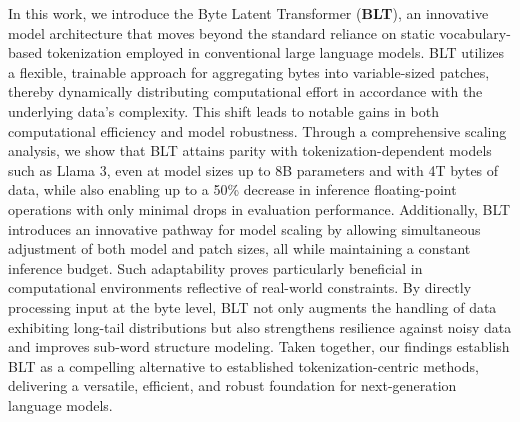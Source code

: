 In this work, we introduce the Byte Latent Transformer (\textbf{BLT}), an innovative model architecture that moves beyond the standard reliance on static vocabulary-based tokenization employed in conventional large language models. \textsc{BLT} utilizes a flexible, trainable approach for aggregating bytes into variable-sized patches, thereby dynamically distributing computational effort in accordance with the underlying data's complexity. This shift leads to notable gains in both computational efficiency and model robustness. Through a comprehensive scaling analysis, we show that {\textsc BLT} attains parity with tokenization-dependent models such as Llama 3, even at model sizes up to 8B parameters and with 4T bytes of data, while also enabling up to a 50\% decrease in inference floating-point operations with only minimal drops in evaluation performance. Additionally, {\textsc BLT} introduces an innovative pathway for model scaling by allowing simultaneous adjustment of both model and patch sizes, all while maintaining a constant inference budget. Such adaptability proves particularly beneficial in computational environments reflective of real-world constraints. By directly processing input at the byte level, {\textsc BLT} not only augments the handling of data exhibiting long-tail distributions but also strengthens resilience against noisy data and improves sub-word structure modeling. Taken together, our findings establish {\textsc BLT} as a compelling alternative to established tokenization-centric methods, delivering a versatile, efficient, and robust foundation for next-generation language models.

